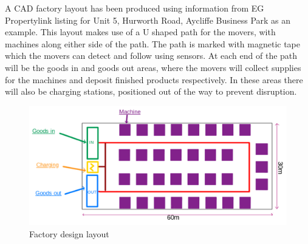 \documentclass[12pt]{article}
\begin{document}
 \FloatBarrier
A CAD factory layout has been produced using information from EG Propertylink listing for Unit 5, Hurworth Road, Aycliffe Business Park \cite{mileway_hurworth_2024} as an example. This layout makes use of a U shaped path for the movers, with  machines along either side of the path. The path is marked with magnetic tape which the movers can detect and follow using sensors. At each end  of the path will be the goods in and goods out areas, where the movers will collect supplies for the machines and deposit finished products respectively. In these areas there will also be charging stations, positioned out of the way to prevent disruption.
\begin{figure}[ht]


        \centering
        \includegraphics[width=0.8\linewidth]{Factory Layout Louis Big Text.png}
        \caption{Factory design layout}
        \label{fig:factory_layout}

\end{figure}
\FloatBarrier
 
\end{document}
